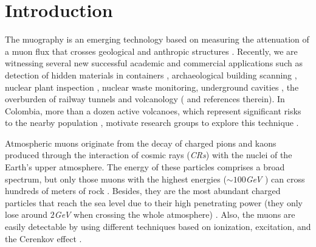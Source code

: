 \documentclass[submitting]{nst}
\begin{document}
\section{Introduction}\label{sec:introduction}
The muography is an emerging technology based on measuring the attenuation of a muon flux that crosses geological and anthropic structures \cite{Kaiser2019}. Recently, we are witnessing several new successful academic and commercial applications such as detection of hidden materials in containers \cite{BlanpiedEtal2015}, archaeological building scanning \cite{MorishimaEtal2017, GomezEtal2016}, nuclear plant inspection \cite{FujiiEtal2013}, nuclear waste monitoring, underground cavities \cite{SaracinoEtal2017}, the overburden of railway tunnels \cite{ThompsonEtal2019} and volcanology (\cite{TanakaOlah2019} and references therein). In Colombia, more than a dozen active volcanoes, which represent significant risks to the nearby population \cite{Cortes2016, Agudelo2016, Munoz2017}, motivate research groups to explore this technique \cite{AsoreyEtal2017B, SierraPortaEtal2018, PenaRodriguezEtal2018, GuerreroEtal2019, ParraAvila2019, PenarodriguezEtal2019}.  

Atmospheric muons originate from the decay of charged pions and kaons produced through the interaction of cosmic rays (\textsl{CRs}) with the nuclei of the Earth's upper atmosphere. The energy of these particles comprises a broad spectrum, but only those muons with the highest energies ($\sim 100$\textsl{GeV}  ) can cross hundreds of meters of rock \cite{MarteauEtal2012}. Besides, they are the most abundant charged particles that reach the sea level due to their high penetrating power (they only lose around $2$\textsl{GeV}   when crossing the whole atmosphere) \cite{MarteauEtal2012}. Also, the muons are easily detectable by using different techniques based on ionization, excitation, and the Cerenkov effect \cite{MarteauEtal2012}. 
\end{document}
